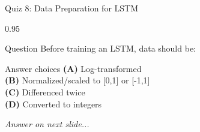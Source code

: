\documentclass[9pt, aspectratio=169, t]{beamer}
\begin{document}
\begin{frame}{Quiz 8: Data Preparation for LSTM}
    \begin{cminipage}{0.95\textwidth}
    \begin{alertblock}{Question}
        Before training an LSTM, data should be:
    \end{alertblock}

    \vspace{0.4cm}

    \begin{block}{Answer choices}
        \textcolor{MainBlue}{\textbf{(A)}} Log-transformed\\[3pt]
        \textcolor{MainBlue}{\textbf{(B)}} Normalized/scaled to [0,1] or [-1,1]\\[3pt]
        \textcolor{MainBlue}{\textbf{(C)}} Differenced twice\\[3pt]
        \textcolor{MainBlue}{\textbf{(D)}} Converted to integers
    \end{block}

    \vspace{0.5cm}

    \begin{center}
        \textit{Answer on next slide...}
    \end{center}
    \end{cminipage}
\end{frame}
\end{document}
